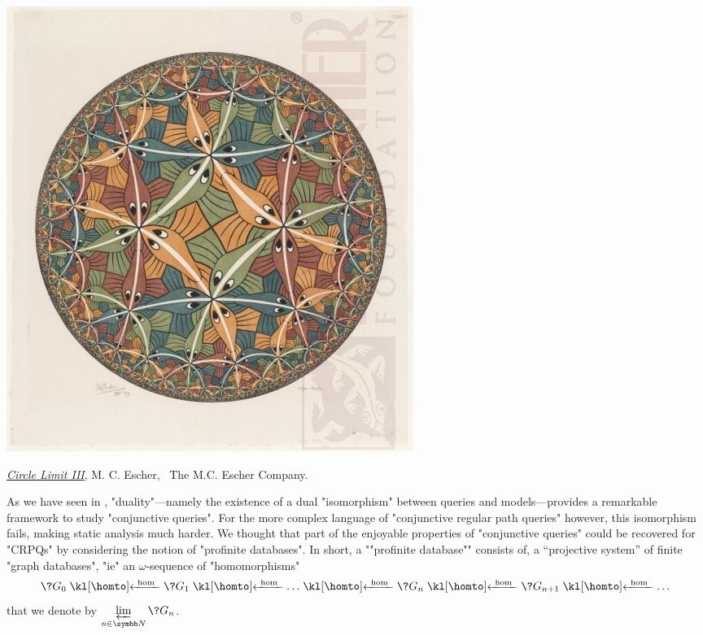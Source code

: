 \begin{marginfigure}[8em]
	\centering
	\includegraphics[width=\linewidth]{fig/escher/CL3.jpg}
	\caption{\href{https://mcescher.com/gallery/symmetry/\#iLightbox[gallery\_image_1]/12}{\emph{Circle Limit III}}, M. C. Escher, \textcopyright~The M.C. Escher Company.}
\end{marginfigure}
As we have seen in , "duality"---namely the existence of
a dual "isomorphism" between queries and models---provides a remarkable framework to
study "conjunctive queries". For the more complex language of "conjunctive regular path queries"
however, this isomorphism fails, making static analysis much harder.
We thought that part of the enjoyable properties of "conjunctive queries"
could be recovered for "CRPQs" by considering the notion of "profinite databases".
In short, a \AP""profinite database"" consists of, a ``projective system'' of finite "graph databases",
"ie" an $\omega$-sequence of "homomorphisms"
\[
	\?G_0 \cohomto \?G_1 \cohomto \dotsc \cohomto \?G_n \cohomto \?G_{n+1} \cohomto \dotsc
\]
that we denote by $\varprojlim\limits_{n\in\N} \?G_n$.

\smallskip

